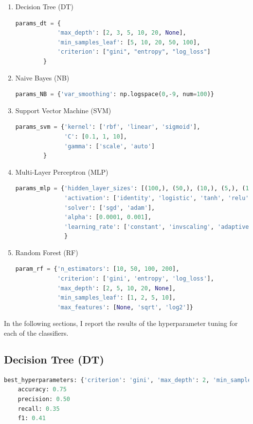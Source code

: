 \documentclass{article}
\begin{document}
\begin{enumerate}
    \item Decision Tree (DT)
    \begin{lstlisting}[language=Python, basicstyle=\small\ttfamily, frame=single, breaklines=true]
        params_dt = {
            'max_depth': [2, 3, 5, 10, 20, None],
            'min_samples_leaf': [5, 10, 20, 50, 100],
            'criterion': ["gini", "entropy", "log_loss"]
        }
    \end{lstlisting}
    \item Naive Bayes (NB)
    \begin{lstlisting}[language=Python, basicstyle=\small\ttfamily, frame=single, breaklines=true]
        params_NB = {'var_smoothing': np.logspace(0,-9, num=100)}
    \end{lstlisting}
    \item Support Vector Machine (SVM)
    \begin{lstlisting}[language=Python, basicstyle=\small\ttfamily, frame=single, breaklines=true]
        params_svm = {'kernel': ['rbf', 'linear', 'sigmoid'],
              'C': [0.1, 1, 10],
              'gamma': ['scale', 'auto']
        }
    \end{lstlisting}
    \item Multi-Layer Perceptron (MLP)
    \begin{lstlisting}[language=Python, basicstyle=\small\ttfamily, frame=single, breaklines=true]
        params_mlp = {'hidden_layer_sizes': [(100,), (50,), (10,), (5,), (100, 50), (50, 10), (10, 5)], 
              'activation': ['identity', 'logistic', 'tanh', 'relu'],
              'solver': ['sgd', 'adam'],
              'alpha': [0.0001, 0.001],
              'learning_rate': ['constant', 'invscaling', 'adaptive']
              }
    \end{lstlisting}
    \item Random Forest (RF)
    \begin{lstlisting}[language=Python, basicstyle=\small\ttfamily, frame=single, breaklines=true]
        param_rf = {'n_estimators': [10, 50, 100, 200],
            'criterion': ['gini', 'entropy', 'log_loss'],
            'max_depth': [2, 5, 10, 20, None],
            'min_samples_leaf': [1, 2, 5, 10],
            'max_features': [None, 'sqrt', 'log2']}
    \end{lstlisting}
\end{enumerate}
In the following sections, I report the results of the hyperparameter tuning for each of the classifiers.
\subsection{Decision Tree (DT)}
\begin{lstlisting}[language=Python, basicstyle=\small\ttfamily, frame=single, breaklines=true]
    best_hyperparameters: {'criterion': 'gini', 'max_depth': 2, 'min_samples_leaf': 20}
    accuracy: 0.75
    precision: 0.50
    recall: 0.35
    f1: 0.41
\end{lstlisting}
\end{document}
